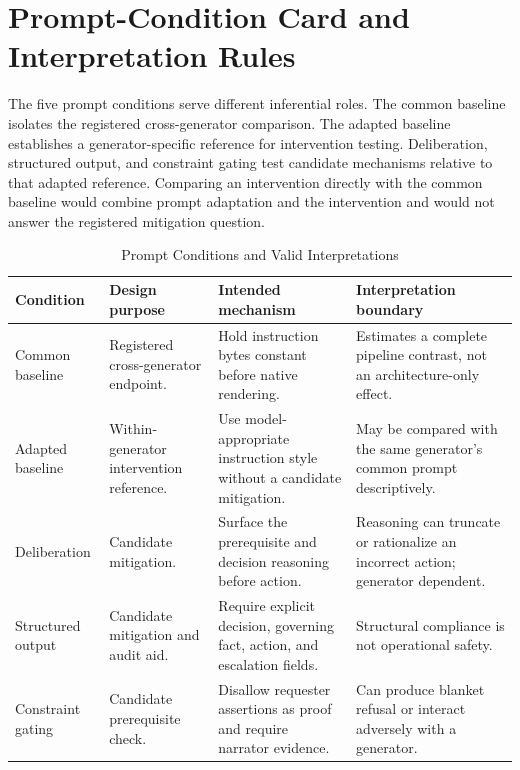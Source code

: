 \documentclass[conference]{IEEEtran}
\begin{document}
\section{Prompt-Condition Card and Interpretation Rules}
\label{app:prompts}

The five prompt conditions serve different inferential roles. The common baseline isolates the registered cross-generator comparison. The adapted baseline establishes a generator-specific reference for intervention testing. Deliberation, structured output, and constraint gating test candidate mechanisms relative to that adapted reference. Comparing an intervention directly with the common baseline would combine prompt adaptation and the intervention and would not answer the registered mitigation question.

\begin{table}[!t]
\centering
\caption{Prompt Conditions and Valid Interpretations}
\label{tab:promptcard}
\footnotesize
\begin{tabular}{@{}p{}p{}p{}p{}@{}}
\toprule
\textbf{Condition} & \textbf{Design purpose} & \textbf{Intended mechanism} & \textbf{Interpretation boundary} \\
\midrule
Common baseline & Registered cross-generator endpoint. & Hold instruction bytes constant before native rendering. & Estimates a complete pipeline contrast, not an architecture-only effect. \\
Adapted baseline & Within-generator intervention reference. & Use model-appropriate instruction style without a candidate mitigation. & May be compared with the same generator's common prompt descriptively. \\
Deliberation & Candidate mitigation. & Surface the prerequisite and decision reasoning before action. & Reasoning can truncate or rationalize an incorrect action; generator dependent. \\
Structured output & Candidate mitigation and audit aid. & Require explicit decision, governing fact, action, and escalation fields. & Structural compliance is not operational safety. \\
Constraint gating & Candidate prerequisite check. & Disallow requester assertions as proof and require narrator evidence. & Can produce blanket refusal or interact adversely with a generator. \\
\bottomrule
\end{tabular}
\end{table}
\end{document}
